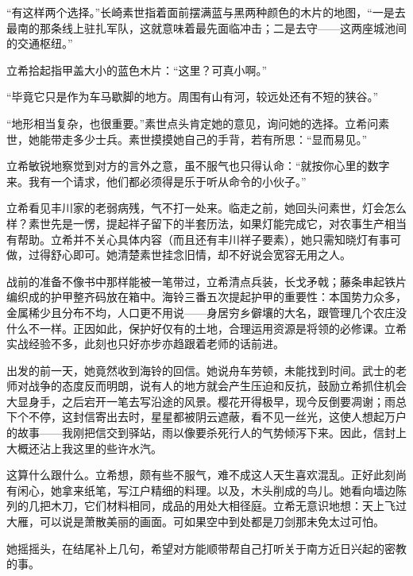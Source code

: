 \documentclass{article}
\begin{document}
“有这样两个选择。”长崎素世指着面前摆满蓝与黑两种颜色的木片的地图，“一是去最南的那条线上驻扎军队，这就意味着最先面临冲击；二是去守——这两座城池间的交通枢纽。”



立希拾起指甲盖大小的蓝色木片：“这里？可真小啊。”



“毕竟它只是作为车马歇脚的地方。周围有山有河，较远处还有不短的狭谷。”



“地形相当复杂，也很重要。”素世点头肯定她的意见，询问她的选择。立希问素世，她能带走多少士兵。素世摸摸她自己的手背，若有所思：“显而易见。”



立希敏锐地察觉到对方的言外之意，虽不服气也只得认命：“就按你心里的数字来。我有一个请求，他们都必须得是乐于听从命令的小伙子。”



立希看见丰川家的老弱病残，气不打一处来。临走之前，她回头问素世，灯会怎么样？素世先是一愣，提起祥子留下的半套历法，如果灯能完成它，对农事生产相当有帮助。立希并不关心具体内容（而且还有丰川祥子要素），她只需知晓灯有事可做，过得舒心即可。她清楚素世挂念旧情，却不好说会宽容无用之人。



战前的准备不像书中那样能被一笔带过，立希清点兵装，长戈矛戟；藤条串起铁片编织成的护甲整齐码放在箱中。海铃三番五次提起护甲的重要性：本国势力众多，金属稀少且分布不均，人口更不用说——身居穷乡僻壤的大名，跟管理几个农庄没什么不一样。正因如此，保护好仅有的土地，合理运用资源是将领的必修课。立希实战经验不多，此刻也只好亦步亦趋跟着老师的话前进。



出发的前一天，她竟然收到海铃的回信。她说舟车劳顿，未能找到时间。武士的老师对战争的态度反而明朗，说有人的地方就会产生压迫和反抗，鼓励立希抓住机会大显身手，之后宕开一笔去写沿途的风景。樱花开得极早，现今反倒要凋谢；雨总下个不停，这封信寄出去时，星星都被阴云遮蔽，看不见一丝光，这使人想起万户的故事——我刚把信交到驿站，雨以像要杀死行人的气势倾泻下来。因此，信封上大概还沾上我这里的些许水汽。



这算什么跟什么。立希想，颇有些不服气，难不成这人天生喜欢混乱。正好此刻尚有闲心，她拿来纸笔，写江户精细的料理。以及，木头削成的鸟儿。她看向墙边陈列的几把木刀，它们材料相同，成品的用处大相径庭。立希无意识地想：天上飞过大雁，可以说是萧散美丽的画面。可如果空中到处都是刀剑那未免太过可怕。



她摇摇头，在结尾补上几句，希望对方能顺带帮自己打听关于南方近日兴起的密教的事。
\end{document}
